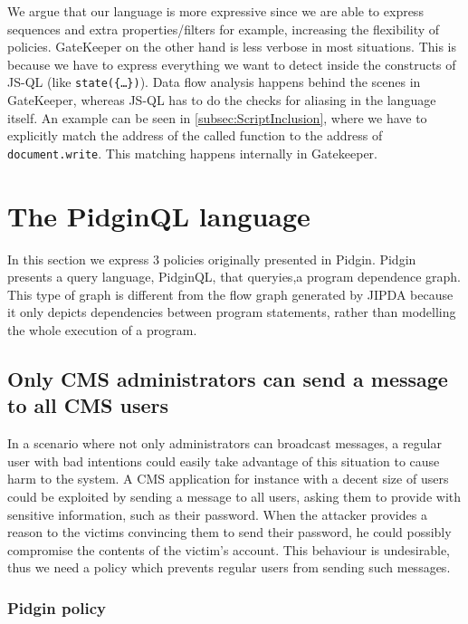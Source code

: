  We argue that our language is more expressive since we are able to express sequences and extra properties/filters for example, increasing the flexibility of policies. GateKeeper on the other hand is less verbose in most situations. This is because we have to express everything we want to detect inside the constructs of JS-QL (like \texttt{state(\{\dots\})}). Data flow analysis happens behind the scenes in GateKeeper, whereas JS-QL has to do the checks for aliasing in the language itself. An example can be seen in \ref{subsec:ScriptInclusion}, where we have to explicitly match the address of the called function to the address of \texttt{document.write}. This matching happens internally in Gatekeeper.


\section{The PidginQL language}
\label{sec:ValidationPidginQL}

In this section we express 3 policies originally presented in Pidgin\cite{PidginQLTechReport}. Pidgin presents a query language, PidginQL, that queryies,a program dependence graph. This type of graph is different from the flow graph generated by JIPDA because it only depicts dependencies between program statements, rather than modelling the whole execution of a program. 

\subsection{Only CMS administrators can send a message to all CMS users}
\label{subsec:CMSAdmin}
In a scenario where not only administrators can broadcast messages, a regular user with bad intentions could easily take advantage of this situation to cause harm to the system. A CMS application for instance with a decent size of users could be exploited by sending a message to all users, asking them to provide with sensitive information, such as their password. When the attacker provides a reason to the victims convincing them to send their password, he could possibly compromise the contents of the victim's account. This behaviour is undesirable, thus we need a policy which prevents regular users from sending such messages.

\subsubsection*{Pidgin policy}

